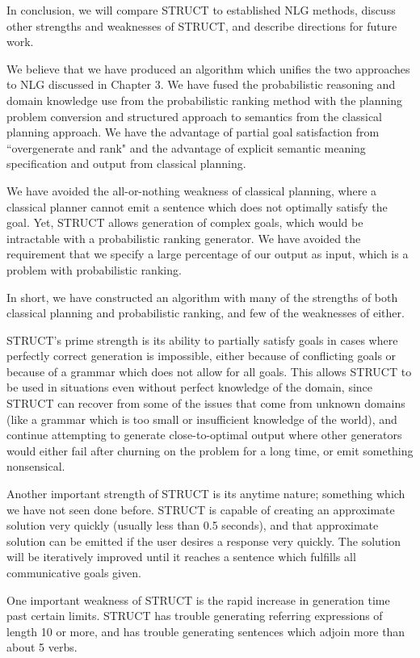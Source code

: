 In conclusion, we will compare STRUCT to established NLG methods,
discuss other strengths and weaknesses of STRUCT, and describe
directions for future work.

We believe that we have produced an algorithm which unifies the
two approaches to NLG discussed in Chapter 3.  
We have fused the probabilistic reasoning and
domain knowledge use from the probabilistic ranking method with
the planning problem conversion and structured approach to semantics
from the classical planning approach.  We have the advantage of
partial goal satisfaction from ``overgenerate and rank" and the
advantage of explicit semantic meaning specification and
output from classical planning.

We have avoided the all-or-nothing weakness of classical planning,
where a classical planner cannot emit a sentence which does not
optimally satisfy the goal.  Yet, STRUCT allows generation of complex
goals, which would be intractable with a probabilistic ranking generator.
We have avoided the requirement that we specify a large percentage of
our output as input, which is a problem with probabilistic ranking.

In short, we have constructed an algorithm with many of the strengths
of both classical planning and probabilistic ranking, and few of the
weaknesses of either.

STRUCT's prime strength is its ability to partially satisfy goals in cases where
perfectly correct generation is impossible, either because of conflicting
goals or because of a grammar which does not allow for all goals.
This allows STRUCT to be used in situations even without perfect knowledge
of the domain, since STRUCT can recover from some of the issues that come
from unknown domains (like a grammar which is too small or insufficient knowledge
of the world), and continue attempting to generate close-to-optimal output
where other generators would either fail after churning on the problem
for a long time, or emit something nonsensical.

Another important strength of STRUCT is its anytime nature; something which
we have not seen done before.  STRUCT is capable of creating an approximate
solution very quickly (usually less than 0.5 seconds), and that approximate solution
can be emitted if the user desires a response very quickly.  The solution will be iteratively
improved until it reaches a sentence which fulfills all communicative goals given.

One important weakness of STRUCT is the rapid increase in generation time
past certain limits.  STRUCT has trouble generating referring expressions of
length 10 or more, and has trouble generating sentences which adjoin
more than about 5 verbs.

